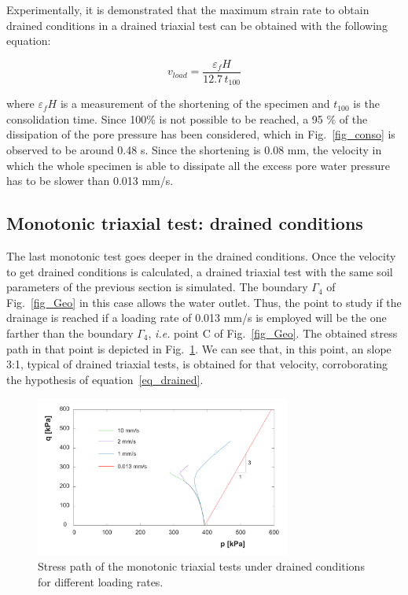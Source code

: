 \documentclass[preprint,12pt,a4paper]{elsarticle}
\begin{document}
Experimentally, it is demonstrated that the maximum strain rate to obtain drained conditions in a drained triaxial test can be obtained with the following equation:

\begin{equation}
v_{load}=\frac{\varepsilon_f H}{12.7 \, t_{100}}
\end{equation}\label{eq_drained}

where $\varepsilon_f H$ is a measurement of the shortening of the specimen and $t_{100}$ is the consolidation time. Since 100\% is not possible to be reached, a 95 \% of the dissipation of the pore pressure has been considered, which in Fig.~\ref{fig_conso} is observed to be around 0.48 s. Since the shortening is 0.08 mm, the velocity in which the whole specimen is able to dissipate all the excess pore water pressure has to be slower than 0.013 mm/s.

\subsection{Monotonic triaxial test: drained conditions}
\label{sec:33}
The last monotonic test goes deeper in the drained conditions. Once the velocity to get drained conditions is calculated, a drained triaxial test with the same soil parameters of the previous section is simulated. The boundary $\Gamma_4$ of Fig.~\ref{fig_Geo} in this case allows the water outlet. Thus, the point to study if the drainage is reached if a loading rate of 0.013 mm/s is employed will be the one farther than the boundary $\Gamma_4$, \textit{i.e.} point C of Fig.~\ref{fig_Geo}.  The obtained stress path in that point is depicted in Fig.~\ref{fig_pq_drained}. We can see that, in this point, an slope 3:1, typical of drained triaxial tests, is obtained for that velocity, corroborating the hypothesis of equation~\eqref{eq_drained}.

\begin{figure}
\centering
\includegraphics[width=0.75\textwidth]{Figs/pq_drained.pdf}
\caption{Stress path of the monotonic triaxial tests under drained conditions for different loading rates.}
\label{fig_pq_drained}
\end{figure}
\end{document}
